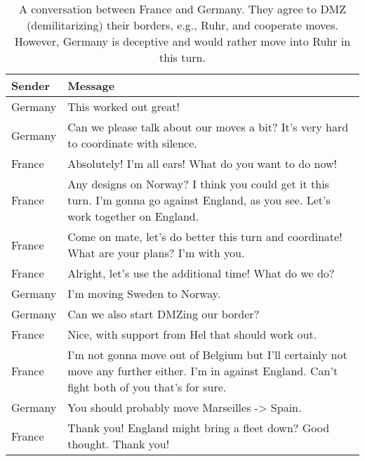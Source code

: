 \begin{table*}
    \centering
    \begin{tabular}{p{3cm}p{12cm}}
    \hline
    \textbf{Sender} & \textbf{Message}   \\ 
    \hline
     Germany & \small{This worked out great!} \\ 
      Germany & \small{Can we please talk about our moves a bit? It's very hard to coordinate with silence.} \\ 
    \rowcolor{grayish}  %
    France & \small{Absolutely! I'm all ears! What do you want to do now!} \\
        \rowcolor{grayish}  %
    France & \small{Any designs on Norway? I think you could get it this turn. I'm gonna go against England, as you see. Let's work together on England.} \\
        \rowcolor{grayish}  %
    France & \small{Come on mate, let's do better this turn and coordinate! What are your plans? I'm with you.} \\
        \rowcolor{grayish}  %
    France & \small{Alright, let's use the additional time! What do we do?} \\
         Germany & \small{I'm moving Sweden to Norway.} \\ 
      Germany & \small{Can we also start DMZing our border?} \\ 
              \rowcolor{grayish}  %
    France & \small{Nice, with support from Hel that should work out.} \\
    \rowcolor{grayish}  %
    France & \small{I'm not gonna move out of Belgium but I'll certainly not move any further either. I'm in against England. Can't fight both of you that's for sure.} \\
  Germany & \small{You should probably move Marseilles -> Spain.} \\ 
    \rowcolor{grayish}  %
    France & \small{Thank you! England might bring a fleet down? Good thought. Thank you!} \\
    \end{tabular}
    \caption{A conversation between France and Germany. They agree to DMZ (demilitarizing) their borders, e.g., Ruhr, and cooperate moves. However, Germany is deceptive and would rather move into Ruhr in this turn.}
    \label{fig:longconvo_dec}
\end{table*}